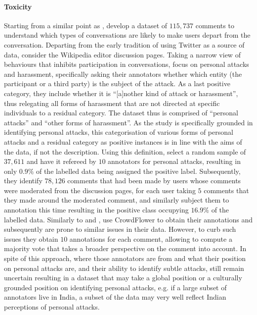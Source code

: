 \paragraph*{Toxicity} Starting from a similar point as \citet{Davidson:2017}, \citet{Wulczyn:2017} develop a dataset  of $115,737$ comments to understand which types of conversations are likely to make users depart from the conversation. Departing from the early tradition of using Twitter as a source of data, \citet{Wulczyn:2017} consider the Wikipedia editor discussion pages. Taking a narrow view of behaviours that inhibits participation in conversations, \citet{Wulczyn:2017} focus on personal attacks and harassment, specifically asking their annotators whether which entity (the participant or a third party) is the subject of the attack. As a last positive category, they include whether it is ``[a]nother kind of attack or harassment'', thus relegating all forms of harassment that are not directed at specific individuals to a residual category. The dataset thus is comprised of ``personal attacks'' and ``other forms of harassment''. As the study is specifically grounded in identifying personal attacks, this categorisation of various forms of personal attacks and a residual category as positive instances is in line with the aims of the data, if not the description.
Using this definition, \citet{Wulczyn:2017} select a random sample of $37,611$ and have it refereed by $10$ annotators for personal attacks, resulting in only $0.9\%$ of the labelled data being assigned the positive label. Subsequently, they identify $78,126$ comments that had been made by users whose comments were moderated from the discussion pages, for each user taking $5$ comments that they made around the moderated comment, and similarly subject them to annotation this time resulting in the positive class occupying $16.9\%$ of the labelled data.
Similarly to \citet{Waseem:2016} and \citet{Davidson:2017}, \citet{Wulczyn:2017} use CrowdFlower to obtain their annotations and subsequently are prone to similar issues in their data. However, to curb such issues they obtain $10$ annotations for each comment, allowing to compute a majority vote that takes a broader perspective on the comment into account. In spite of this approach, where those annotators are from and what their position on personal attacks are, and their ability to identify subtle attacks, still remain uncertain resulting in a dataset that may take a global position or a culturally grounded position on identifying personal attacks, e.g. if a large subset of annotators live in India, a subset of the data may very well reflect Indian perceptions of personal attacks.
